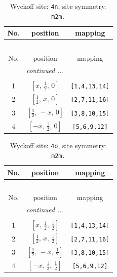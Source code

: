 \documentclass[fleqn,8pt]{jsarticle}
\begin{document}
\renewcommand{\arraystretch}{1.2}
\begin{longtable}{ccc}
\caption{Wyckoff site: {\tt 4n}, site symmetry: {\tt m2m.}}
 \\
 \hline \hline
No. & position & mapping \\ \hline \endfirsthead

\multicolumn{2}{l}{\tablename\ \thetable{}} \\
 \hline \hline
No. & position & mapping \\ \hline \endhead

 \hline \hline
\multicolumn{2}{r}{\footnotesize\it continued ...} \\ \endfoot

 \hline \hline
\multicolumn{2}{r}{} \\ \endlastfoot

1 & $\left[ x,\, \frac{1}{2},\, 0 \right]$ & {\tt [1,4,13,14]} \\ \hline
2 & $\left[ \frac{1}{2},\, x,\, 0 \right]$ & {\tt [2,7,11,16]} \\ \hline
3 & $\left[ \frac{1}{2},\, - x,\, 0 \right]$ & {\tt [3,8,10,15]} \\ \hline
4 & $\left[ - x,\, \frac{1}{2},\, 0 \right]$ & {\tt [5,6,9,12]} \\
\end{longtable}
\renewcommand{\arraystretch}{1.2}
\begin{longtable}{ccc}
\caption{Wyckoff site: {\tt 4o}, site symmetry: {\tt m2m.}}
 \\
 \hline \hline
No. & position & mapping \\ \hline \endfirsthead

\multicolumn{2}{l}{\tablename\ \thetable{}} \\
 \hline \hline
No. & position & mapping \\ \hline \endhead

 \hline \hline
\multicolumn{2}{r}{\footnotesize\it continued ...} \\ \endfoot

 \hline \hline
\multicolumn{2}{r}{} \\ \endlastfoot

1 & $\left[ x,\, \frac{1}{2},\, \frac{1}{2} \right]$ & {\tt [1,4,13,14]} \\ \hline
2 & $\left[ \frac{1}{2},\, x,\, \frac{1}{2} \right]$ & {\tt [2,7,11,16]} \\ \hline
3 & $\left[ \frac{1}{2},\, - x,\, \frac{1}{2} \right]$ & {\tt [3,8,10,15]} \\ \hline
4 & $\left[ - x,\, \frac{1}{2},\, \frac{1}{2} \right]$ & {\tt [5,6,9,12]} \\
\end{longtable}
\end{document}
